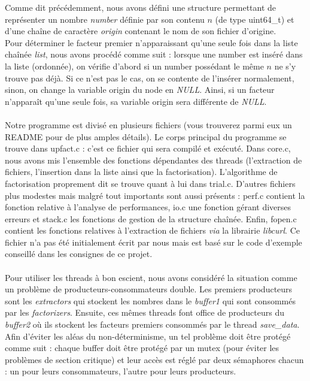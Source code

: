 \documentclass{article}
\begin{document}
Comme dit précédemment, nous avons défini une structure permettant de représenter un nombre \emph{number} définie par son contenu $n$ (de type uint64\_t) et d'une chaîne de caractère \emph{origin} contenant le nom de son fichier d'origine.\\
Pour déterminer le facteur premier n'apparaissant qu'une seule fois dans la liste chaînée \emph{list}, nous avons procédé comme suit : lorsque une number est inséré dans la liste (ordonnée), on vérifie d'abord si un number possédant le même $n$ ne s'y trouve pas déjà. Si ce n'est pas le cas, on se contente de l'insérer normalement, sinon, on change la variable origin du node en \emph{NULL}. Ainsi, si un facteur n'apparaît qu'une seule fois, sa variable origin sera différente de \emph{NULL}.\\
\\
Notre programme est divisé en plusieurs fichiers (vous trouverez parmi eux un README pour de plus amples détails). Le corps principal du programme se trouve dans upfact.c : c'est ce fichier qui sera compilé et exécuté. Dans core.c, nous avons mis l'ensemble des fonctions dépendantes des threads (l'extraction de fichiers, l'insertion dans la liste ainsi que la factorisation). L'algorithme de factorisation proprement dit se trouve quant à lui dans trial.c. D'autres fichiers plus modestes mais malgré tout importants sont aussi présents : perf.c contient la fonction relative à l'analyse de performances, io.c une fonction gérant diverses erreurs et stack.c les fonctions de gestion de la structure chaînée. Enfin, fopen.c contient les fonctions relatives à l'extraction de fichiers \emph{via} la librairie \emph{libcurl}. Ce fichier n'a pas été initialement écrit par nous mais est basé sur le code d'exemple conseillé dans les consignes de ce projet.\\
\\
Pour utiliser les threads à bon escient, nous avons considéré la situation comme un problème de producteurs-consommateurs double. Les premiers producteurs sont les \emph{extractors} qui stockent les nombres dans le \emph{buffer1} qui sont consommés par les \emph{factorizers}. Ensuite, ces mêmes threads font office de producteurs du \emph{buffer2} où ils stockent les facteurs premiers consommés par le thread \emph{save\_data}. \\
Afin d'éviter les aléas du non-déterminisme, un tel problème doit être protégé comme suit : chaque buffer doit être protégé par un mutex (pour éviter les problèmes de section critique) et leur accès est réglé par deux sémaphores chacun : un pour leurs consommateurs, l'autre pour leurs producteurs.
\end{document}
